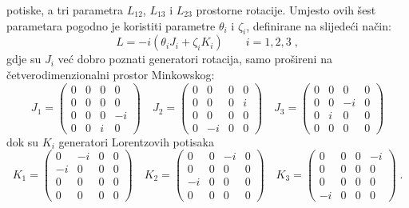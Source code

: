 potiske, a tri parametra $L_{12}$, $L_{13}$ i $L_{23}$ prostorne rotacije.
Umjesto ovih šest parametara pogodno je koristiti parametre
$\theta_i$ i $\zeta_i$,  definirane na slijedeći način:
\begin{equation}
 L = -i (\theta_i J_i + \zeta_i K_i)  \qquad i=1,2,3  \;,
\label{eq:LJK}
\end{equation}
gdje su $J_i$ već dobro poznati generatori rotacija, samo prošireni
na četverodimenzionalni prostor Minkowskog:
\begin{equation}
 J_1 =
\begin{pmatrix}
0 & 0 & 0 & 0 \\
0 & 0 & 0 & 0 \\
0 & 0 & 0 & -i \\
0 & 0 & i & 0
\end{pmatrix} \quad
 J_2 =
\begin{pmatrix}
0 & 0 & 0 & 0 \\
0 & 0 & 0 & i \\
0 & 0 & 0 & 0 \\
0 & -i & 0 & 0
\end{pmatrix} \quad
J_3 =
\begin{pmatrix}
0 & 0 & 0 & 0 \\
0 & 0 & -i & 0 \\
0 & i & 0 & 0 \\
0 & 0 & 0 & 0
\label{eq:defJi}
\end{pmatrix}
\end{equation}
dok su $K_i$ generatori Lorentzovih potisaka
\begin{equation}
K_1 =
\begin{pmatrix}
0 & -i & 0 & 0 \\
-i & 0 & 0 & 0 \\
0 & 0 & 0 & 0 \\
0 & 0 & 0 & 0
\end{pmatrix} \quad
K_2=
\begin{pmatrix}
0 & 0 & -i & 0 \\
0 & 0 & 0 & 0 \\
-i & 0 & 0 & 0 \\
0 & 0 & 0 & 0
\end{pmatrix} \quad
K_3 =
\begin{pmatrix}
0 & 0 & 0 & -i \\
0 & 0 & 0 & 0 \\
0 & 0 & 0 & 0 \\
-i & 0 & 0 & 0
\end{pmatrix} \;.
\label{eq:defKi}
\end{equation}

